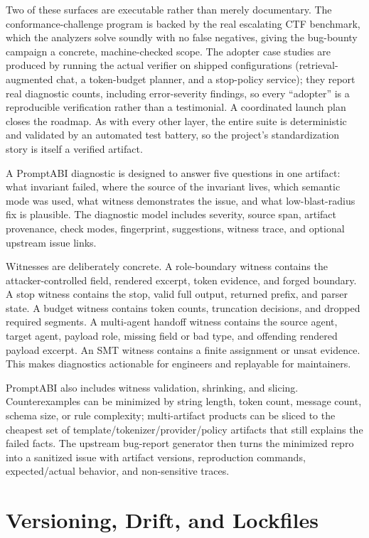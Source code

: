 \documentclass[10pt]{article}
\begin{document}
Two of these surfaces are executable rather than merely documentary. The
conformance-challenge program is backed by the real escalating CTF benchmark,
which the analyzers solve soundly with no false negatives, giving the bug-bounty
campaign a concrete, machine-checked scope. The adopter case studies are produced
by running the actual verifier on shipped configurations (retrieval-augmented
chat, a token-budget planner, and a stop-policy service); they report real
diagnostic counts, including error-severity findings, so every ``adopter'' is a
reproducible verification rather than a testimonial. A coordinated launch plan
closes the roadmap. As with every other layer, the entire suite is deterministic
and validated by an automated test battery, so the project's standardization
story is itself a verified artifact.


A PromptABI diagnostic is designed to answer five questions in one artifact:
what invariant failed, where the source of the invariant lives, which semantic
mode was used, what witness demonstrates the issue, and what low-blast-radius
fix is plausible. The diagnostic model includes severity, source span,
artifact provenance, check modes, fingerprint, suggestions, witness trace, and
optional upstream issue links.

Witnesses are deliberately concrete. A role-boundary witness contains the
attacker-controlled field, rendered excerpt, token evidence, and forged
boundary. A stop witness contains the stop, valid full output, returned prefix,
and parser state. A budget witness contains token counts, truncation decisions,
and dropped required segments. A multi-agent handoff witness contains the source
agent, target agent, payload role, missing field or bad type, and offending
rendered payload excerpt. An SMT witness contains a finite assignment or unsat
evidence. This makes diagnostics actionable for engineers and replayable for
maintainers.

PromptABI also includes witness validation, shrinking, and slicing.
Counterexamples can be minimized by string length, token count, message count,
schema size, or rule complexity; multi-artifact products can be sliced to the
cheapest set of template/tokenizer/provider/policy artifacts that still explains
the failed facts. The upstream bug-report generator then turns the minimized
repro into a sanitized issue with artifact versions, reproduction commands,
expected/actual behavior, and non-sensitive traces.

\newpage
\section{Versioning, Drift, and Lockfiles}
\end{document}
